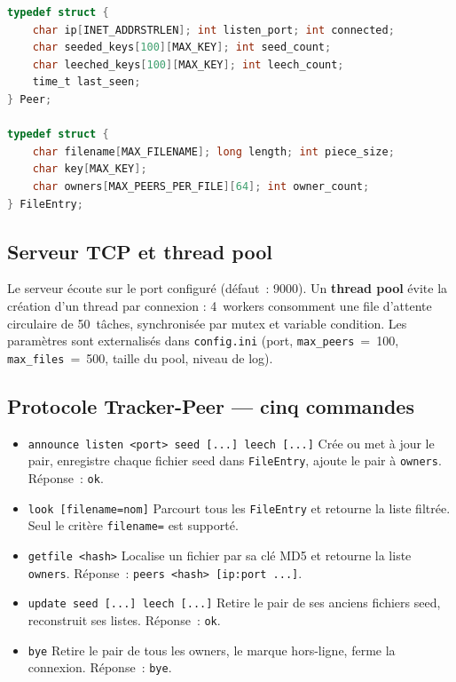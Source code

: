 \documentclass[11pt, a4paper]{article}
\begin{document}
\begin{lstlisting}[language=C]
typedef struct {
    char ip[INET_ADDRSTRLEN]; int listen_port; int connected;
    char seeded_keys[100][MAX_KEY]; int seed_count;
    char leeched_keys[100][MAX_KEY]; int leech_count;
    time_t last_seen;
} Peer;

typedef struct {
    char filename[MAX_FILENAME]; long length; int piece_size;
    char key[MAX_KEY];
    char owners[MAX_PEERS_PER_FILE][64]; int owner_count;
} FileEntry;
\end{lstlisting}

\subsection{Serveur TCP et thread pool}

Le serveur écoute sur le port configuré (défaut~: 9000).
Un \textbf{thread pool} évite la création d'un thread par connexion :
4~workers consomment une file d'attente circulaire de 50~tâches,
synchronisée par mutex et variable condition.
Les paramètres sont externalisés dans \texttt{config.ini}
(port, \texttt{max\_peers}~=~100, \texttt{max\_files}~=~500,
taille du pool, niveau de log).

\subsection{Protocole Tracker-Peer --- cinq commandes}

\begin{itemize}

\item\texttt{announce listen <port> seed [...] leech [...]}
      Crée ou met à jour le pair, enregistre chaque fichier seed dans
      \texttt{FileEntry}, ajoute le pair à \texttt{owners}. Réponse~: \texttt{ok}.

\item\texttt{look [filename=nom]}
      Parcourt tous les \texttt{FileEntry} et retourne la liste filtrée.
      Seul le critère \texttt{filename=} est supporté.

\item\texttt{getfile <hash>}
      Localise un fichier par sa clé MD5 et retourne la liste
      \texttt{owners}. Réponse~: \texttt{peers <hash> [ip:port ...]}.

\item\texttt{update seed [...] leech [...]}
      Retire le pair de ses anciens fichiers seed, reconstruit ses listes.
      Réponse~: \texttt{ok}.

\item\texttt{bye}
      Retire le pair de tous les owners, le marque hors-ligne,
      ferme la connexion. Réponse~: \texttt{bye}.
\end{itemize}
\end{document}
